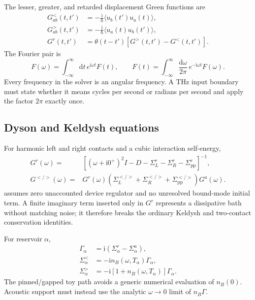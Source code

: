 \documentclass[11pt]{article}
\newcommand{\dd}{\mathrm{d}}
\newcommand{\ii}{\mathrm{i}}
\newcommand{\pp}{\mathrm{pp}}
\renewcommand{\_}{\OriginalTextUnderscore\allowbreak}
\begin{document}
The lesser, greater, and retarded displacement Green functions are
\begin{align}
G^<_{ab}(t,t') &=
 -\frac{\ii}{\hbar}\langle u_b(t')u_a(t)\rangle,\\
G^>_{ab}(t,t') &=
 -\frac{\ii}{\hbar}\langle u_a(t)u_b(t')\rangle,\\
G^r(t,t') &= \theta(t-t')\left[G^>(t,t')-G^<(t,t')\right].
\end{align}
The Fourier pair is
\begin{equation}
  F(\omega)=\int_{-\infty}^{\infty}\dd t\,
  e^{\ii\omega t}F(t),\qquad
  F(t)=\int_{-\infty}^{\infty}\frac{\dd\omega}{2\pi}\,
  e^{-\ii\omega t}F(\omega).
\end{equation}
Every frequency in the solver is an angular frequency. A THz input boundary
must state whether it means cycles per second or radians per second and apply
the factor \(2\pi\) exactly once.

\subsection{Dyson and Keldysh equations}

For harmonic left and right contacts and a cubic interaction self-energy,
\begin{align}
G^r(\omega)={}&
\left[
(\omega+\ii0^+)^2I-D-\Sigma_L^r-\Sigma_R^r-\Sigma_\pp^r
\right]^{-1},
\label{eq:dyson}\\
G^{</>}(\omega)={}&G^r(\omega)
\left(
\Sigma_L^{</>}+\Sigma_R^{</>}+\Sigma_\pp^{</>}
\right)G^a(\omega).
\label{eq:keldysh}
\end{align}
 assumes zero unaccounted device regulator and no unresolved
bound-mode initial term. A finite imaginary term inserted only in
\(G^r\) represents a dissipative bath without matching noise; it therefore
breaks the ordinary Keldysh and two-contact conservation identities.

For reservoir \(\alpha\),
\begin{align}
\Gamma_\alpha &=
\ii\left(\Sigma_\alpha^r-\Sigma_\alpha^a\right),\\
\Sigma_\alpha^< &= -\ii n_B(\omega,T_\alpha)\Gamma_\alpha,\\
\Sigma_\alpha^> &= -\ii [1+n_B(\omega,T_\alpha)]\Gamma_\alpha .
\end{align}
The pinned/gapped toy path avoids a generic numerical evaluation of
\(n_B(0)\). Acoustic support must instead use the analytic
\(\omega\rightarrow0\) limit of \(n_B\Gamma\).
\end{document}
